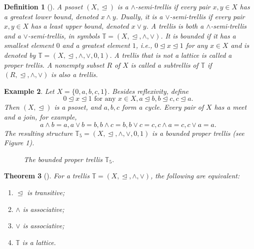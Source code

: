 \documentclass[preprint,12pt]{elsarticle}
\newtheorem{theorem}{Theorem}[section]
\newtheorem{definition}[theorem]{Definition}
\newtheorem{example}[theorem]{Example}
\begin{document}
\begin{definition}[\cite{Skala1971}]
\emph{A psoset $(X,\trianglelefteq)$ is a $\wedge$-\emph{semi-trellis} if every pair $x,y\in X$ has a greatest lower bound, denoted $x\wedge y$. Dually, it is a $\vee$-\emph{semi-trellis} if every pair $x,y\in X$ has a least upper bound, denoted $x\vee y$. A \emph{trellis} is both a $\wedge$-semi-trellis and a $\vee$-semi-trellis, in symbols $\mathbb{T}=(X,\trianglelefteq,\wedge,\vee)$. It is \emph{bounded} if it has a smallest element $0$ and a greatest element $1$, i.e., $0\trianglelefteq x\trianglelefteq1$ for any $x\in X$ and is denoted by $\mathbb{T}=(X,\trianglelefteq,\wedge,\vee,0,1).$
A trellis that is not a lattice is called a \emph{proper trellis}. A nonempty subset $R$ of $X$ is called a \emph{subtrellis} of $\mathbb{T}$ if $(R,\trianglelefteq,\wedge,\vee)$ is also a trellis.}
\end{definition}

\begin{example}\label{ex:T5}
\emph{Let $X=\{0,a,b,c,1\}$. Besides reflexivity, define
$$
 0\trianglelefteq x\trianglelefteq 1 \mbox{ for any }x\in X, a\trianglelefteq b, b\trianglelefteq c, c\trianglelefteq a.
$$
Then $(X,\trianglelefteq)$ is a psoset, and $a,b,c$ form a cycle. Every pair of $X$ has a meet and a join, for example,
$$
 a\wedge b=a, a\vee b=b,
 b\wedge c=b, b\vee c=c,
 c\wedge a=c, c\vee a=a.
$$
The resulting structure $\mathbb{T}_5=(X,\trianglelefteq,\wedge,\vee,0,1)$ is a bounded proper trellis (see Figure 1).}

\begin{figure}[ht]
\centering
{}
\caption{The bounded proper trellis $\mathbb{T}_5$.}
\label{fig:T5}
\end{figure}
\end{example}
\begin{theorem}[\cite{Skala1971}]\label{thm:skala-equivalence}
For a trellis $\mathbb{T}=(X,\trianglelefteq,\wedge,\vee)$, the following are equivalent:
\begin{enumerate}[label=(\roman*)]
\item $\trianglelefteq$ is transitive;
\item $\wedge$ is associative;
\item $\vee$ is associative;
\item $\mathbb{T}$ is a lattice.
\end{enumerate}
\end{theorem}
\end{document}
